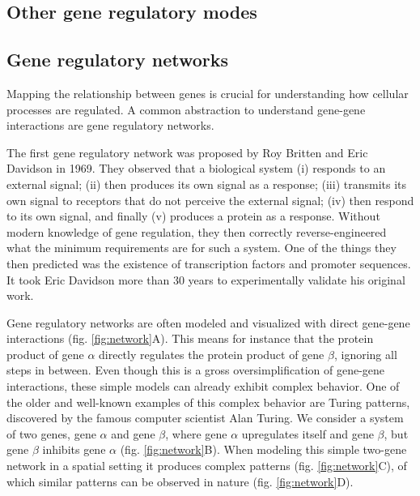 \subsection{Other gene regulatory modes}

\subsection{Gene regulatory networks}

Mapping the relationship between genes is crucial for understanding how cellular processes are regulated. A common abstraction to understand gene-gene interactions are gene regulatory networks.  

The first gene regulatory network was proposed by Roy Britten and Eric Davidson in 1969\cite{Britten_1969}. They observed that a biological system (i) responds to an external signal; (ii) then produces its own signal as a response; (iii) transmits its own signal to receptors that do not perceive the external signal; (iv) then respond to its own signal, and finally (v) produces a protein as a response. Without modern knowledge of gene regulation, they then correctly reverse-engineered what the minimum requirements are for such a system. One of the things they then predicted was the existence of transcription factors and promoter sequences. It took Eric Davidson more than 30 years to experimentally validate his original work\cite{Davidson_2002}.

Gene regulatory networks are often modeled and visualized with direct gene-gene interactions (fig. \ref{fig:network}A). This means for instance that the protein product of gene $\alpha$ directly regulates the protein product of gene $\beta$, ignoring all steps in between. Even though this is a gross oversimplification of gene-gene interactions, these simple models can already exhibit complex behavior. One of the older and well-known examples of this complex behavior are Turing patterns, discovered by the famous computer scientist Alan Turing\cite{Turing1952}. We consider a system of two genes, gene $\alpha$ and gene $\beta$, where gene $\alpha$ upregulates itself and gene $\beta$, but gene $\beta$ inhibits gene $\alpha$ (fig. \ref{fig:network}B). When modeling this simple two-gene network in a spatial setting it produces complex patterns (fig. \ref{fig:network}C), of which similar patterns can be observed in nature (fig. \ref{fig:network}D).

